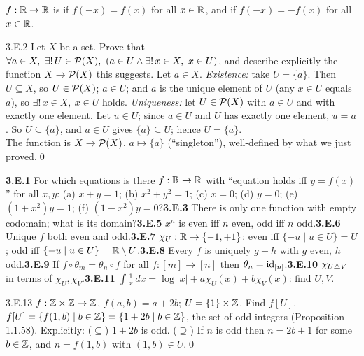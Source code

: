 
\begin{key}
$f:\mathbb{R}\to\mathbb{R}$ is  if $f(-x)=f(x)$ for all $x\in\mathbb{R}$, and  if $f(-x)=-f(x)$ for all $x\in\mathbb{R}$.
\end{key}

\begin{bookex}[recommended]{3.E.2}
Let $X$ be a set. Prove that $\forall a\in X,\ \exists!\,U\in\PS(X),\ (a\in U\wedge\exists!\,x\in X,\ x\in U)$, and describe explicitly the function $X\to\mathcal{P}(X)$ this suggests.
\solution
Let $a\in X$. \emph{Existence:} take $U=\{a\}$. Then $U\subseteq X$, so $U\in\mathcal{P}(X)$; $a\in U$; and $a$ is the unique element of $U$ (any $x\in U$ equals $a$), so $\exists!\,x\in X,\ x\in U$ holds. \emph{Uniqueness:} let $U\in\mathcal{P}(X)$ with $a\in U$ and with exactly one element. Let $u\in U$; since $a\in U$ and $U$ has exactly one element, $u=a$. So $U\subseteq\{a\}$, and $a\in U$ gives $\{a\}\subseteq U$; hence $U=\{a\}$.\\
The function is $X\to\mathcal{P}(X)$, $a\mapsto\{a\}$ (``singleton''), well-defined by what we just proved.\qed
\end{bookex}

\begin{trybox}[{3.E.1, 3.E.3, 3.E.5--3.E.11 \fO}]
\textbf{3.E.1} For which equations is there $f:\mathbb{R}\to\mathbb{R}$ with ``equation holds iff $y=f(x)$'' for all $x,y$: (a) $x+y=1$; (b) $x^2+y^2=1$; (c) $x=0$; (d) $y=0$; (e) $(1+x^2)y=1$; (f) $(1-x^2)y=0$?\quad \textbf{3.E.3} There is only one function with empty codomain; what is its domain?\quad \textbf{3.E.5} $x^n$ is even iff $n$ even, odd iff $n$ odd.\quad \textbf{3.E.6} Unique $f$ both even and odd.\quad \textbf{3.E.7} $\chi_U:\mathbb{R}\to\{-1,+1\}$: even iff $\{-u\mid u\in U\}=U$; odd iff $\{-u\mid u\in U\}=\mathbb{R}\setminus U$.\quad \textbf{3.E.8} Every $f$ is uniquely $g+h$ with $g$ even, $h$ odd.\quad \textbf{3.E.9} If $f\circ\theta_m=\theta_n\circ f$ for all $f:[m]\to[n]$ then $\theta_n=\mathrm{id}_{[n]}$.\quad \textbf{3.E.10} $\chi_{U\mathbin{\triangle} V}$ in terms of $\chi_U,\chi_V$.\quad \textbf{3.E.11} $\int\frac1x\,dx=\log|x|+a\chi_U(x)+b\chi_V(x)$: find $U,V$.
\end{trybox}

\begin{bookex}[essential]{3.E.13}
$f:\mathbb{Z}\times\mathbb{Z}\to\mathbb{Z}$, $f(a,b)=a+2b$; $U=\{1\}\times\mathbb{Z}$. Find $f[U]$.
\solution
$f[U]=\{f(1,b)\mid b\in\mathbb{Z}\}=\{1+2b\mid b\in\mathbb{Z}\}$, the set of odd integers (Proposition 1.1.58). Explicitly: ($\subseteq$) $1+2b$ is odd. ($\supseteq$) If $n$ is odd then $n=2b+1$ for some $b\in\mathbb{Z}$, and $n=f(1,b)$ with $(1,b)\in U$.\qed
\end{bookex}

